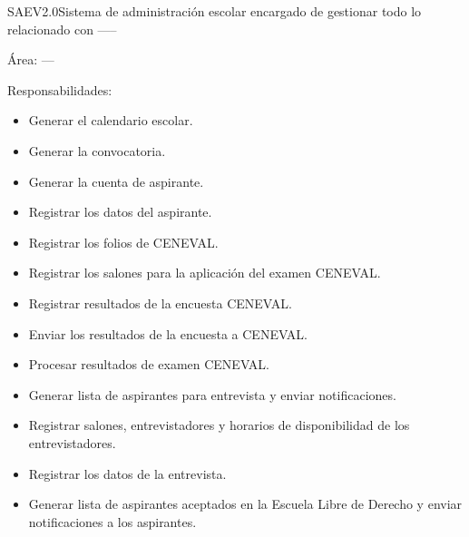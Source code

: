 \begin{Actor}{SAEV2.0}{Sistema de administración escolar encargado de gestionar todo lo relacionado con ----- }
	\item[Área:] ---
	\item[Responsabilidades:] \hspace{1pt}
	\begin{itemize}
		\item Generar el calendario escolar.
		\item Generar la convocatoria.
		\item Generar la cuenta de aspirante.
		\item Registrar los datos del aspirante.
		\item Registrar los folios de CENEVAL.
		\item Registrar los salones para la aplicación del examen CENEVAL.
		\item Registrar resultados de la encuesta CENEVAL.
		\item Enviar los resultados de la encuesta a CENEVAL.
		\item Procesar resultados de examen CENEVAL.
		\item Generar lista de aspirantes para entrevista y enviar notificaciones.
		\item Registrar salones, entrevistadores y horarios de disponibilidad de los entrevistadores.
		\item Registrar los datos de la entrevista.
		\item Generar lista de aspirantes aceptados en la Escuela Libre de Derecho y enviar notificaciones a los aspirantes.
	\end{itemize}
\end{Actor}
